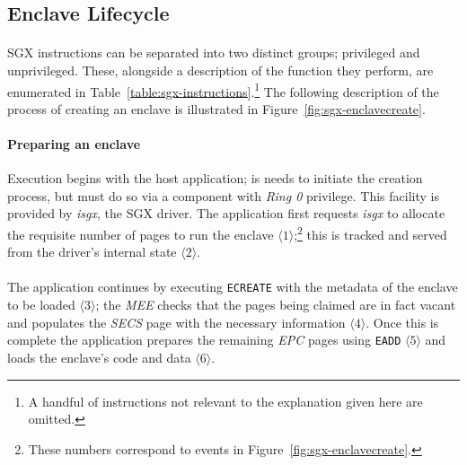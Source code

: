 \subsection{Enclave Lifecycle}
\label{sec:sgx-lifecycle}

\paragraph{} SGX instructions can be separated into two distinct groups; privileged and unprivileged. These, alongside a description of the function they perform, are enumerated in Table~\ref{table:sgx-instructions}.\footnote{A handful of instructions not relevant to the explanation given here are omitted.} The following description of the process of creating an enclave is illustrated in Figure~\ref{fig:sgx-enclavecreate}.

\paragraph{Preparing an enclave} Execution begins with the host application; is needs to initiate the creation process, but must do so via a component with \textit{Ring 0} privilege. This facility is provided by \textit{isgx}, the SGX driver. The application first requests \textit{isgx} to allocate the requisite number of pages to run the enclave $\langle 1 \rangle$;\footnote{These numbers correspond to events in Figure~\ref{fig:sgx-enclavecreate}.} this is tracked and served from the driver's internal state $\langle 2 \rangle$.

\paragraph{} The application continues by executing \texttt{ECREATE} with the metadata of the enclave to be loaded $\langle 3 \rangle$; the \textit{MEE} checks that the pages being claimed are in fact vacant and populates the \textit{SECS} page with the necessary information $\langle 4 \rangle$. Once this is complete the application prepares the remaining \textit{EPC} pages using \texttt{EADD} $\langle 5 \rangle$ and loads the enclave's code and data $\langle 6 \rangle$.

